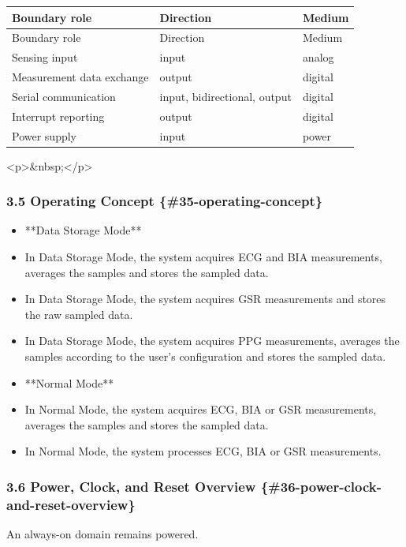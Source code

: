 \documentclass[11pt]{article}
\begin{document}
\begin{longtable}{|p{}|p{}|p{}|}
\hline
Boundary role & Direction & Medium \\
\hline
\endfirsthead
\hline
Boundary role & Direction & Medium \\
\hline
\endhead
Sensing input & input & analog \\
\hline
Measurement data exchange & output & digital \\
\hline
Serial communication & input, bidirectional, output & digital \\
\hline
Interrupt reporting & output & digital \\
\hline
Power supply & input & power \\
\hline
\end{longtable}


<p>\&nbsp;</p>

\subsubsection{3.5 Operating Concept \{\#35-operating-concept\}}


\begin{itemize}
\item **Data Storage Mode**
\item In Data Storage Mode, the system acquires ECG and BIA measurements, averages the samples and stores the sampled data.
\item In Data Storage Mode, the system acquires GSR measurements and stores the raw sampled data.
\item In Data Storage Mode, the system acquires PPG measurements, averages the samples according to the user's configuration and stores the sampled data.
\item **Normal Mode**
\item In Normal Mode, the system acquires ECG, BIA or GSR measurements, averages the samples and stores the sampled data.
\item In Normal Mode, the system processes ECG, BIA or GSR measurements.
\end{itemize}

\subsubsection{3.6 Power, Clock, and Reset Overview \{\#36-power-clock-and-reset-overview\}}


An always-on domain remains powered.
\end{document}
